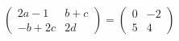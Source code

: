 \hspace*{2mm}\begin{minipage}[t]{\dimexpr\linewidth-2mm\relax}\vspace{0pt}
$\begin{pmatrix} 2a-1 & b+c \\ -b+2c & 2d \end{pmatrix}=\begin{pmatrix} 0 & -2 \\ 5 & 4 \end{pmatrix}$\end{minipage}
